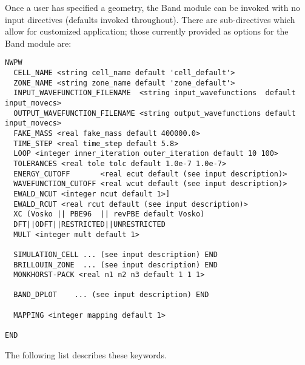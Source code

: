 Once a user has specified a geometry, the Band module can be invoked with no input directives (defaults invoked throughout).  There are sub-directives which allow for customized application; those currently provided as options for the Band module are:
\begin{verbatim}
NWPW
  CELL_NAME <string cell_name default 'cell_default'>
  ZONE_NAME <string zone_name default 'zone_default'>
  INPUT_WAVEFUNCTION_FILENAME  <string input_wavefunctions  default input_movecs>
  OUTPUT_WAVEFUNCTION_FILENAME <string output_wavefunctions default input_movecs>
  FAKE_MASS <real fake_mass default 400000.0>
  TIME_STEP <real time_step default 5.8>
  LOOP <integer inner_iteration outer_iteration default 10 100>
  TOLERANCES <real tole tolc default 1.0e-7 1.0e-7>
  ENERGY_CUTOFF       <real ecut default (see input description)>
  WAVEFUNCTION_CUTOFF <real wcut default (see input description)>
  EWALD_NCUT <integer ncut default 1>]
  EWALD_RCUT <real rcut default (see input description)>
  XC (Vosko || PBE96  || revPBE default Vosko)
  DFT||ODFT||RESTRICTED||UNRESTRICTED
  MULT <integer mult default 1>
  
  SIMULATION_CELL ... (see input description) END
  BRILLOUIN_ZONE  ... (see input description) END
  MONKHORST-PACK <real n1 n2 n3 default 1 1 1>

  BAND_DPLOT    ... (see input description) END

  MAPPING <integer mapping default 1>

END 
\end{verbatim}
The following list describes these keywords.
